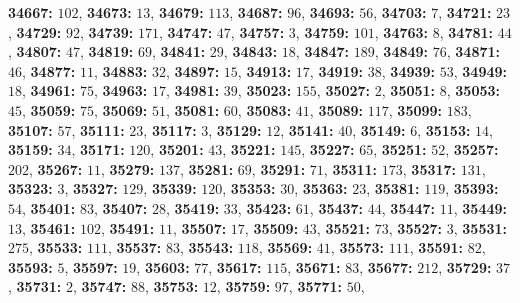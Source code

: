 \textsf{\bfseries 34667:} $102$, \textsf{\bfseries 34673:} $13$, \textsf{\bfseries 34679:} $113$, \textsf{\bfseries 34687:} $96$, \textsf{\bfseries 34693:} $56$, \textsf{\bfseries 34703:} $7$, \textsf{\bfseries 34721:} $23$, \textsf{\bfseries 34729:} $92$, \textsf{\bfseries 34739:} $171$, \textsf{\bfseries 34747:} $47$, \textsf{\bfseries 34757:} $3$, \textsf{\bfseries 34759:} $101$, \textsf{\bfseries 34763:} $8$, \textsf{\bfseries 34781:} $44$, \textsf{\bfseries 34807:} $47$, \textsf{\bfseries 34819:} $69$, \textsf{\bfseries 34841:} $29$, \textsf{\bfseries 34843:} $18$, \textsf{\bfseries 34847:} $189$, \textsf{\bfseries 34849:} $76$, \textsf{\bfseries 34871:} $46$, \textsf{\bfseries 34877:} $11$, \textsf{\bfseries 34883:} $32$, \textsf{\bfseries 34897:} $15$, \textsf{\bfseries 34913:} $17$, \textsf{\bfseries 34919:} $38$, \textsf{\bfseries 34939:} $53$, \textsf{\bfseries 34949:} $18$, \textsf{\bfseries 34961:} $75$, \textsf{\bfseries 34963:} $17$, \textsf{\bfseries 34981:} $39$, \textsf{\bfseries 35023:} $155$, \textsf{\bfseries 35027:} $2$, \textsf{\bfseries 35051:} $8$, \textsf{\bfseries 35053:} $45$, \textsf{\bfseries 35059:} $75$, \textsf{\bfseries 35069:} $51$, \textsf{\bfseries 35081:} $60$, \textsf{\bfseries 35083:} $41$, \textsf{\bfseries 35089:} $117$, \textsf{\bfseries 35099:} $183$, \textsf{\bfseries 35107:} $57$, \textsf{\bfseries 35111:} $23$, \textsf{\bfseries 35117:} $3$, \textsf{\bfseries 35129:} $12$, \textsf{\bfseries 35141:} $40$, \textsf{\bfseries 35149:} $6$, \textsf{\bfseries 35153:} $14$, \textsf{\bfseries 35159:} $34$, \textsf{\bfseries 35171:} $120$, \textsf{\bfseries 35201:} $43$, \textsf{\bfseries 35221:} $145$, \textsf{\bfseries 35227:} $65$, \textsf{\bfseries 35251:} $52$, \textsf{\bfseries 35257:} $202$, \textsf{\bfseries 35267:} $11$, \textsf{\bfseries 35279:} $137$, \textsf{\bfseries 35281:} $69$, \textsf{\bfseries 35291:} $71$, \textsf{\bfseries 35311:} $173$, \textsf{\bfseries 35317:} $131$, \textsf{\bfseries 35323:} $3$, \textsf{\bfseries 35327:} $129$, \textsf{\bfseries 35339:} $120$, \textsf{\bfseries 35353:} $30$, \textsf{\bfseries 35363:} $23$, \textsf{\bfseries 35381:} $119$, \textsf{\bfseries 35393:} $54$, \textsf{\bfseries 35401:} $83$, \textsf{\bfseries 35407:} $28$, \textsf{\bfseries 35419:} $33$, \textsf{\bfseries 35423:} $61$, \textsf{\bfseries 35437:} $44$, \textsf{\bfseries 35447:} $11$, \textsf{\bfseries 35449:} $13$, \textsf{\bfseries 35461:} $102$, \textsf{\bfseries 35491:} $11$, \textsf{\bfseries 35507:} $17$, \textsf{\bfseries 35509:} $43$, \textsf{\bfseries 35521:} $73$, \textsf{\bfseries 35527:} $3$, \textsf{\bfseries 35531:} $275$, \textsf{\bfseries 35533:} $111$, \textsf{\bfseries 35537:} $83$, \textsf{\bfseries 35543:} $118$, \textsf{\bfseries 35569:} $41$, \textsf{\bfseries 35573:} $111$, \textsf{\bfseries 35591:} $82$, \textsf{\bfseries 35593:} $5$, \textsf{\bfseries 35597:} $19$, \textsf{\bfseries 35603:} $77$, \textsf{\bfseries 35617:} $115$, \textsf{\bfseries 35671:} $83$, \textsf{\bfseries 35677:} $212$, \textsf{\bfseries 35729:} $37$, \textsf{\bfseries 35731:} $2$, \textsf{\bfseries 35747:} $88$, \textsf{\bfseries 35753:} $12$, \textsf{\bfseries 35759:} $97$, \textsf{\bfseries 35771:} $50$, 
